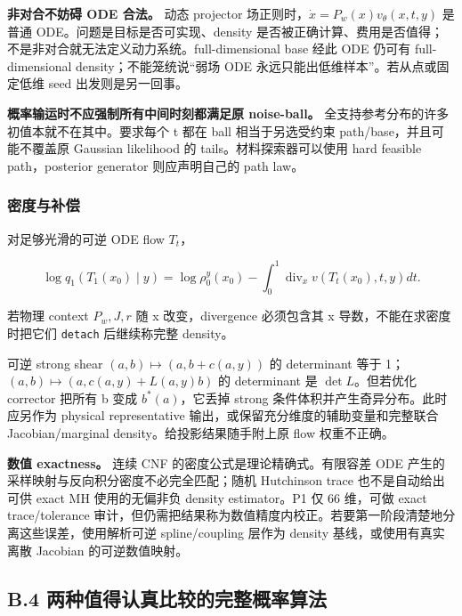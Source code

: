 \documentclass[
  11pt,
  a4paper,
]{article}
\begin{document}
\textbf{非对合不妨碍 ODE 合法。} 动态 projector
场正则时，\(\dot x=P_w(x)v_\theta(x,t,y)\) 是普通
ODE。问题是目标是否可实现、density
是否被正确计算、费用是否值得；不是非对合就无法定义动力系统。full-dimensional
base 经此 ODE 仍可有 full-dimensional density；不能笼统说``弱场 ODE
永远只能出低维样本''。若从点或固定低维 seed 出发则是另一回事。

\textbf{概率输运时不应强制所有中间时刻都满足原 noise-ball。}
全支持参考分布的许多初值本就不在其中。要求每个 t 都在 ball
相当于另选受约束 path/base，并且可能不覆盖原 Gaussian likelihood 的
tails。材料探索器可以使用 hard feasible path，posterior generator
则应声明自己的 path law。

\hypertarget{ux5bc6ux5ea6ux4e0eux8865ux507f}{%
\subsubsection{密度与补偿}\label{ux5bc6ux5ea6ux4e0eux8865ux507f}}

对足够光滑的可逆 ODE flow \(T_t\)，

\[
\log q_1(T_1(x_0)\mid y)=\log\rho_0^y(x_0)-\int_0^1\operatorname{div}_xv(T_t(x_0),t,y)dt.
\]

若物理 context \(P_w,J,r\) 随 x 改变，divergence 必须包含其 x
导数，不能在求密度时把它们 \nolinkurl{detach} 后继续称完整 density。

可逆 strong shear \((a,b)\mapsto(a,b+c(a,y))\) 的 determinant 等于
1；\((a,b)\mapsto(a,c(a,y)+L(a,y)b)\) 的 determinant 是
\(\det L\)。但若优化 corrector 把所有 b 变成 \(b^*(a)\)，它丢掉 strong
条件体积并产生奇异分布。此时应另作为 physical representative
输出，或保留充分维度的辅助变量和完整联合 Jacobian/marginal
density。给投影结果随手附上原 flow 权重不正确。

\textbf{数值 exactness。} 连续 CNF 的密度公式是理论精确式。有限容差 ODE
产生的采样映射与反向积分密度不必完全匹配；随机 Hutchinson trace
也不是自动给出可供 exact MH 使用的无偏非负 density estimator。P1 仅 66
维，可做 exact trace/tolerance
审计，但仍需把结果称为数值精度内校正。若要第一阶段清楚地分离这些误差，使用解析可逆
spline/coupling 层作为 density 基线，或使用有真实离散 Jacobian
的可逆数值映射。

\hypertarget{b.4-ux4e24ux79cdux503cux5f97ux8ba4ux771fux6bd4ux8f83ux7684ux5b8cux6574ux6982ux7387ux7b97ux6cd5}{%
\subsection{B.4
两种值得认真比较的完整概率算法}\label{b.4-ux4e24ux79cdux503cux5f97ux8ba4ux771fux6bd4ux8f83ux7684ux5b8cux6574ux6982ux7387ux7b97ux6cd5}}
\end{document}
